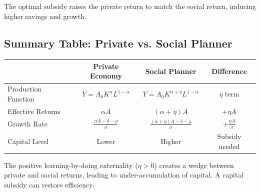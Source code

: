 \medskip
The optimal subsidy raises the private return to match the social return, inducing higher savings and growth.

\clearpage

\subsection*{Summary Table: Private vs. Social Planner}

\begin{center}
\begin{tabular}{lccc}
\toprule
 & Private Economy & Social Planner & Difference \\
\midrule
Production Function & $Y = A_0 K^\alpha L^{1-\alpha}$ & $Y = A_0 K^{\alpha+\eta} L^{1-\alpha}$ & $\eta$ term \\
Effective Returns & $\alpha A$ & $(\alpha + \eta)A$ & $+\eta A$ \\
Growth Rate & $\frac{\alpha A - \delta - \rho}{\sigma}$ & $\frac{(\alpha+\eta)A - \delta - \rho}{\sigma}$ & $+\frac{\eta A}{\sigma}$ \\
Capital Level & Lower & Higher & Subsidy needed \\
\bottomrule
\end{tabular}
\end{center}

\medskip
\begin{tcolorbox}[colback=green!10,colframe=green3,title=Key Takeaway]
The positive learning-by-doing externality ($\eta > 0$) creates a wedge between private and social returns, leading to under-accumulation of capital. A capital subsidy can restore efficiency.
\end{tcolorbox}
